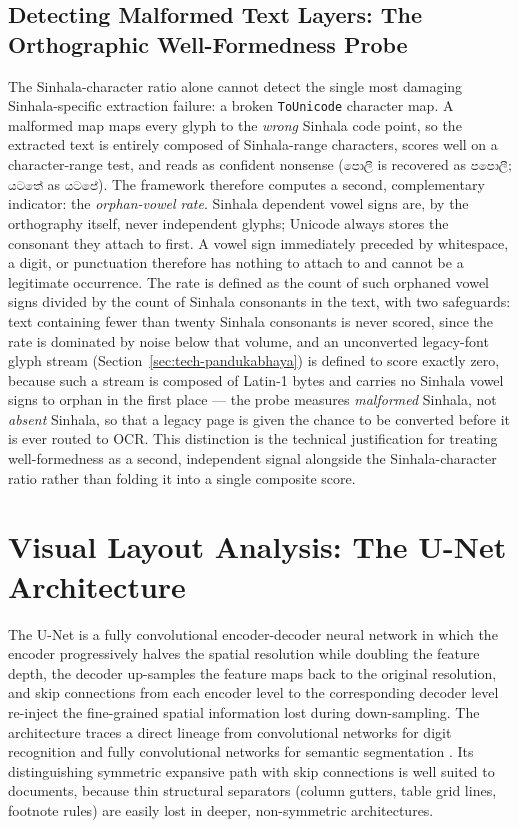 \documentclass[12pt,a4paper,oneside]{report}
\begin{document}
\subsection{Detecting Malformed Text Layers: The Orthographic Well-Formedness Probe}
\label{sec:tech-wellformed}
The Sinhala-character ratio alone cannot detect the single most damaging Sinhala-specific extraction failure: a broken \texttt{ToUnicode} character map. A malformed map maps every glyph to the \textit{wrong} Sinhala code point, so the extracted text is entirely composed of Sinhala-range characters, scores well on a character-range test, and reads as confident nonsense (\texttt{පොලී} is recovered as \texttt{පපොලී}; \texttt{යටතේ} as \texttt{යටපේ}). The framework therefore computes a second, complementary indicator: the \textit{orphan-vowel rate}. Sinhala dependent vowel signs are, by the orthography itself, never independent glyphs; Unicode always stores the consonant they attach to first. A vowel sign immediately preceded by whitespace, a digit, or punctuation therefore has nothing to attach to and cannot be a legitimate occurrence. The rate is defined as the count of such orphaned vowel signs divided by the count of Sinhala consonants in the text, with two safeguards: text containing fewer than twenty Sinhala consonants is never scored, since the rate is dominated by noise below that volume, and an unconverted legacy-font glyph stream (Section~\ref{sec:tech-pandukabhaya}) is defined to score exactly zero, because such a stream is composed of Latin-1 bytes and carries no Sinhala vowel signs to orphan in the first place --- the probe measures \textit{malformed} Sinhala, not \textit{absent} Sinhala, so that a legacy page is given the chance to be converted before it is ever routed to OCR. This distinction is the technical justification for treating well-formedness as a second, independent signal alongside the Sinhala-character ratio rather than folding it into a single composite score.

\section{Visual Layout Analysis: The U-Net Architecture}
\label{sec:tech-unet}
The U-Net \cite{ronneberger2015unet} is a fully convolutional encoder-decoder neural network in which the encoder progressively halves the spatial resolution while doubling the feature depth, the decoder up-samples the feature maps back to the original resolution, and skip connections from each encoder level to the corresponding decoder level re-inject the fine-grained spatial information lost during down-sampling. The architecture traces a direct lineage from convolutional networks for digit recognition \cite{lecun1989backprop} and fully convolutional networks for semantic segmentation \cite{long2015fcn}. Its distinguishing symmetric expansive path with skip connections is well suited to documents, because thin structural separators (column gutters, table grid lines, footnote rules) are easily lost in deeper, non-symmetric architectures.
\end{document}
